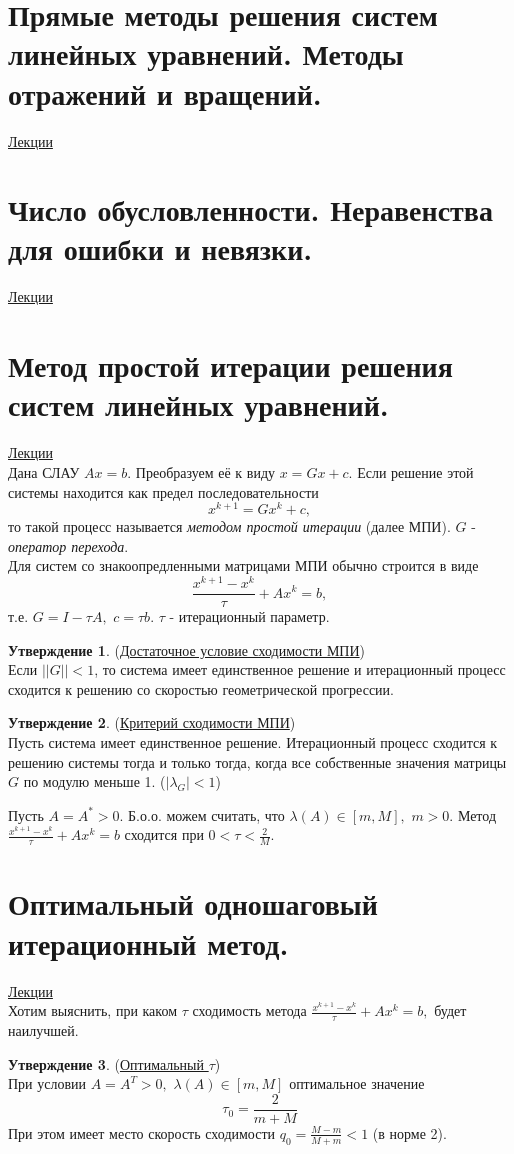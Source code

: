 \documentclass[specialist, subf, href, colorlinks=true, 12pt, times, mtpro, final]{disser}
\theoremstyle{definition}
\newtheorem{state}{Утверждение}[section]
\begin{document}
{\section {Прямые методы решения систем линейных уравнений. Методы отражений и вращений.}
    \hyperlink {lects.54}{Лекции}\\

\section {Число обусловленности. Неравенства для ошибки и невязки.}
    \hyperlink {lects.56}{Лекции}\\

\section {Метод простой итерации решения систем линейных уравнений.}
    \hyperlink {lects.58}{Лекции}\\
    Дана СЛАУ $Ax = b$. Преобразуем её к виду $x = Gx + c$. Если решение этой системы находится как предел последовательности
    $$
        x^{k+1} = Gx^{k} + c,
    $$
    то такой процесс называется {\it методом простой итерации} (далее МПИ). $G$ - {\it оператор перехода}.\\
    Для систем со знакоопредленными матрицами МПИ обычно строится в виде
    $$
        \frac{x^{k+1} - x^{k}}{\tau} + Ax^{k} = b,
    $$
    т.е. $G = I - \tau A, \,\, c = \tau b$. $\tau$ - итерационный параметр.
    \begin{state} (\hyperlink {lects.58}{Достаточное условие сходимости МПИ})\\
    Если $||G|| < 1$, то система имеет единственное решение и итерационный процесс сходится
    к решению со скоростью геометрической прогрессии.
    \end{state}
    \begin{state} (\hyperlink {lects.59}{Критерий сходимости МПИ})\\
    Пусть система имеет единственное решение. Итерационный процесс сходится к решению системы тогда и только тогда, когда все собственные значения матрицы $G$ по модулю меньше 1. ($|\lambda_{G}| < 1$)
    \end{state}
    Пусть $A = A^* > 0$. Б.о.о. можем считать, что $\lambda(A) \in [m, M],\,\, m > 0$.
    Метод $ \frac{x^{k+1} - x^{k}}{\tau} + Ax^{k} = b$ сходится при $0 < \tau < \frac{2}{M}$.

\newpage
\section {Оптимальный одношаговый итерационный метод.}
    \hyperlink {lects.60}{Лекции}\\
    Хотим выяснить, при каком $\tau$ сходимость метода
    $\frac{x^{k+1} - x^{k}}{\tau} + Ax^{k} = b,$ будет наилучшей.
    \begin{state} (\hyperlink {lects.60}{Оптимальный $\tau$})\\
    При условии $A = A^T > 0, \,\, \lambda(A) \in [m, M]$ оптимальное значение
    $$\tau_0 = \frac{2}{m+M}$$
    При этом имеет место скорость сходимости $q_0 = \frac{M-m}{M+m} < 1$ (в норме 2).
    \end{state}

}
\end{document}
